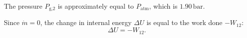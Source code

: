 The pressure \( P_{\text{g,2}} \) is approximately equal to \( P_{\text{atm}} \), which is \( 1.90 \, \text{bar} \).  

Since \( \dot{m} = 0 \), the change in internal energy \( \Delta U \) is equal to the work done \( -W_{12} \):  
\[
\Delta U = -W_{12}.
\]